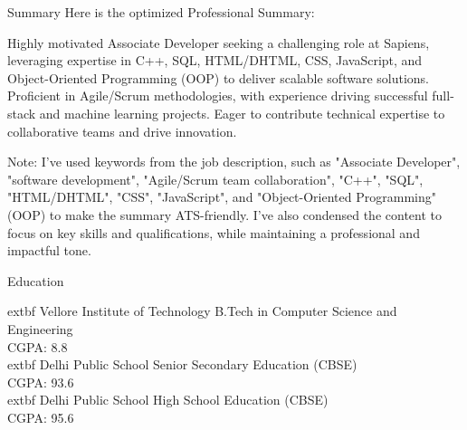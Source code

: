 \documentclass[]{resume}
\begin{document}
\begin{rSection}{Summary}
Here is the optimized Professional Summary:

Highly motivated Associate Developer seeking a challenging role at Sapiens, leveraging expertise in C++, SQL, HTML/DHTML, CSS, JavaScript, and Object-Oriented Programming (OOP) to deliver scalable software solutions. Proficient in Agile/Scrum methodologies, with experience driving successful full-stack and machine learning projects. Eager to contribute technical expertise to collaborative teams and drive innovation.

Note: I've used keywords from the job description, such as "Associate Developer", "software development", "Agile/Scrum team collaboration", "C++", "SQL", "HTML/DHTML", "CSS", "JavaScript", and "Object-Oriented Programming" (OOP) to make the summary ATS-friendly. I've also condensed the content to focus on key skills and qualifications, while maintaining a professional and impactful tone.
\end{rSection}

\begin{rSection}{Education}

	extbf{ Vellore Institute of Technology } \hfill B.Tech in Computer Science and Engineering \\
CGPA: 8.8 \\

	extbf{ Delhi Public School } \hfill Senior Secondary Education (CBSE) \\
CGPA: 93.6 \\

	extbf{ Delhi Public School } \hfill High School Education (CBSE) \\
CGPA: 95.6 \\

\end{rSection}
\end{document}
